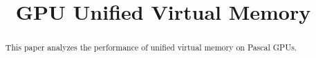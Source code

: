\documentclass[sigconf]{acmart}
\begin{document}
\title{GPU Unified Virtual Memory}




\begin{abstract}

This paper analyzes the performance of unified virtual memory on Pascal GPUs.

\end{abstract}

%
%




\maketitle




 
\end{document}

